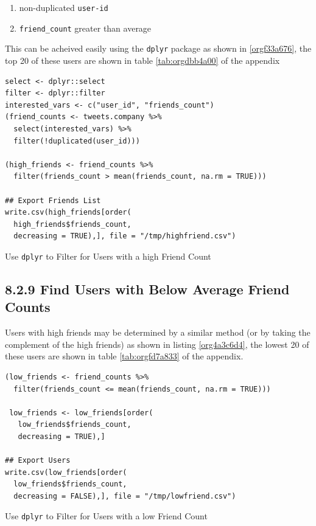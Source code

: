 \documentclass[11pt]{article}
\begin{document}
\begin{enumerate}
\item non-duplicated \texttt{user-id}
\item \texttt{friend\_count} greater than average
\end{enumerate}

This can be acheived easily using the \texttt{dplyr} package as shown in \ref{orgf33a676}, the top 20 of these users are shown in table \ref{tab:orgdbb4a00} of the appendix

\begin{listing}[htbp]
\begin{verbatim}
select <- dplyr::select
filter <- dplyr::filter
interested_vars <- c("user_id", "friends_count")
(friend_counts <- tweets.company %>%
  select(interested_vars) %>%
  filter(!duplicated(user_id)))

(high_friends <- friend_counts %>%
  filter(friends_count > mean(friends_count, na.rm = TRUE)))

## Export Friends List
write.csv(high_friends[order(
  high_friends$friends_count,
  decreasing = TRUE),], file = "/tmp/highfriend.csv")
\end{verbatim}
\caption{\label{orgf33a676}Use \texttt{dplyr} to Filter for Users with a high Friend Count}
\end{listing}

\subsection{8.2.9 Find Users with Below Average Friend Counts}
\label{sec:org13358f9}
Users with high friends may be determined by a similar method (or by taking the complement of the high friends) as shown in listing \ref{org4a3c6d4}, the lowest 20 of these users are shown in table \ref{tab:orgfd7a833} of the appendix.

\begin{listing}[htbp]
\begin{verbatim}
(low_friends <- friend_counts %>%
  filter(friends_count <= mean(friends_count, na.rm = TRUE)))

 low_friends <- low_friends[order(
   low_friends$friends_count,
   decreasing = TRUE),]

## Export Users
write.csv(low_friends[order(
  low_friends$friends_count,
  decreasing = FALSE),], file = "/tmp/lowfriend.csv")
\end{verbatim}
\caption{\label{org4a3c6d4}Use \texttt{dplyr} to Filter for Users with a low Friend Count}
\end{listing}
\end{document}
